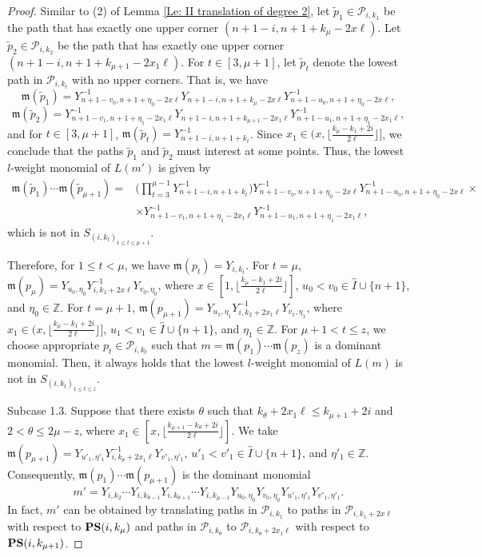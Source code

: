 \documentclass[12pt, reqno]{amsart}
\numberwithin{equation}{section}
\begin{document}
{\begin{proof}
Similar to (2) of Lemma \ref{Le: II translation of degree 2}, let $\widetilde{p}_1\in \mathscr{P}_{i,k_1}$ be the path that has exactly one upper corner $(n+1-i,n+1+k_{\mu}-2x \ell)$. Let $\widetilde{p}_2\in \mathscr{P}_{i,k_2}$ be the path that has exactly one upper corner $(n+1-i,n+1+k_{\mu+1}-2x_1 \ell)$. For $t\in[3, \mu+1]$, let $\widetilde{p}_t$ denote the lowest path in $\mathscr{P}_{i,k_t}$ with no upper corners. That is, we have 
\[\mathfrak{m}(\widetilde{p}_{1})=Y_{n+1-v_0,n+1+\eta_0-2x \ell}^{-1}Y_{n+1-i,n+1+k_{\mu}-2x \ell}Y_{n+1-u_0, n+1+\eta_0-2x \ell}^{-1},
\]
\[
\mathfrak{m}(\widetilde{p}_{2})=Y_{n+1-v_1,n+1+\eta_1-2x_1 \ell}^{-1}Y_{n+1-i,n+1+k_{\mu+1}-2x_1 \ell}Y_{n+1-u_1, n+1+\eta_1-2x_1 \ell}^{-1},
\]
and for $t\in[3, \mu+1]$, $\mathfrak{m}(\widetilde{p}_{t})=Y_{n+1-i,n+1+k_t}^{-1}$. Since $x_1\in (x,\lfloor\frac{k_\mu-k_1+2i}{2 \ell}\rfloor]$, we conclude that the paths $\widetilde{p}_{1}$ and $\widetilde{p}_{2}$ must interest at some points. Thus, the lowest $l$-weight monomial of $L(m')$ is given by 
\begin{align*}
 \mathfrak{m}(\widetilde{p}_{1})\cdots \mathfrak{m}(\widetilde{p}_{\mu+1})=&\big( \prod_{t=3}^{\mu-1} Y_{n+1-i,n+1+k_{t}}^{-1} \big)
 Y_{n+1-v_0,n+1+\eta_0-2x \ell}^{-1} Y_{n+1-u_0,n+1+\eta_0-2x \ell}^{-1} \times \\
 & \times Y_{n+1-v_1,n+1+\eta_1-2x_1 \ell}^{-1}Y_{n+1-u_1,n+1+\eta_1-2x_1 \ell}^{-1}, 
\end{align*}
which is not in $S_{(i,k_t)_{1 \leq t \leq \mu+1}}$.


Therefore, for $1\leq t<\mu$, we have $\mathfrak{m}(p_t)=Y_{i,k_t}$. For $t=\mu$, $\mathfrak{m}(p_{\mu})=Y_{u_0,\eta_0}Y_{i,k_1+2x\ell}^{-1}Y_{v_0,\eta_0}$, where $x\in[1,\lfloor\frac{k_\mu-k_1+2i}{2 \ell}\rfloor]$, $u_0<v_0 \in \hat{I} \cup \{n+1\}$, and $\eta_0\in \mathbb{Z}$. For $t=\mu+1$, $\mathfrak{m}(p_{\mu+1})=Y_{u_1,\eta_1} Y_{i,k_2+2x_1\ell}^{-1}Y_{v_1,\eta_1}$, where $x_1\in (x,\lfloor\frac{k_{\mu}-k_1+2i}{2 \ell}\rfloor]$, $u_1<v_1\in \hat{I} \cup \{n+1\}$, and $\eta_1\in \mathbb{Z}$. For $\mu+1<t\leq z$, we choose appropriate $p_t\in\mathscr{P}_{i,k_t}$ such that $m=\mathfrak{m}(p_1)\cdots \mathfrak{m}(p_z)$ is a dominant monomial. Then, it always holds that the lowest $l$-weight monomial of $L(m)$ is not in $S_{(i,k_t)_{1 \leq t \leq z}}$.


Subcase 1.3. Suppose that there exists $\theta$ such that $k_\theta+2x_1\ell\leq k_{\mu+1}+2i$ and $2<\theta \leq 2\mu-z$, where $x_1\in [x,\lfloor\frac{k_{\mu+1}-k_\theta+2i}{2 \ell}\rfloor]$. We take $\mathfrak{m}(p_{\mu+1})=Y_{u'_1,\eta'_1} Y_{i,k_\theta+2x_1\ell}^{-1}Y_{v'_1,\eta'_1}$, $u'_1<v'_1\in \hat{I} \cup \{n+1\}$, and $\eta'_1\in \mathbb{Z}$. Consequently, $\mathfrak{m}(p_1)\cdots \mathfrak{m}(p_{\mu+1})$ is the dominant monomial
\[
m'=Y_{i,k_{2}}\cdots Y_{i,k_{\theta-1}}Y_{i,k_{\theta+1}}\cdots Y_{i,k_{\mu-1}} Y_{u_0,\eta_0}Y_{v_0,\eta_0} Y_{u'_1,\eta'_1}Y_{v'_1,\eta'_1}.
\]
In fact, $m'$ can be obtained by translating paths in $\mathscr{P}_{i,k_1}$ to paths in $\mathscr{P}_{i,k_1+2x \ell}$ with respect to ${\bf PS}(i,k_{\mu})$ and paths in $\mathscr{P}_{i,k_\theta}$ to $\mathscr{P}_{i,k_\theta+2x_1 \ell}$ with respect to ${\bf PS}(i,k_{\mu+1})$.


\end{proof}}
\end{document}

